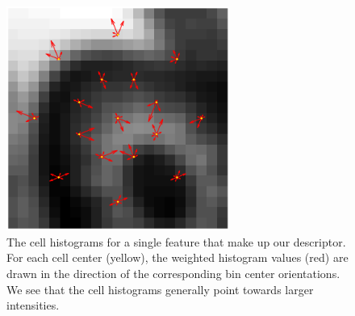 \documentclass[thesis.tex]{subfiles}
\begin{document}
\begin{figure}[tb]
    \centering
    \includegraphics[width=0.65\textwidth]{img/cellHistFigureGo.pdf}
    \caption{The cell histograms for a single feature that make up our descriptor. For each cell center (yellow), the weighted histogram values (red) are drawn in the direction of the corresponding bin center orientations. We see that the cell histograms generally point towards larger intensities.}
    \label{fig:cellHistFigureGoM}
\end{figure}
\end{document}
